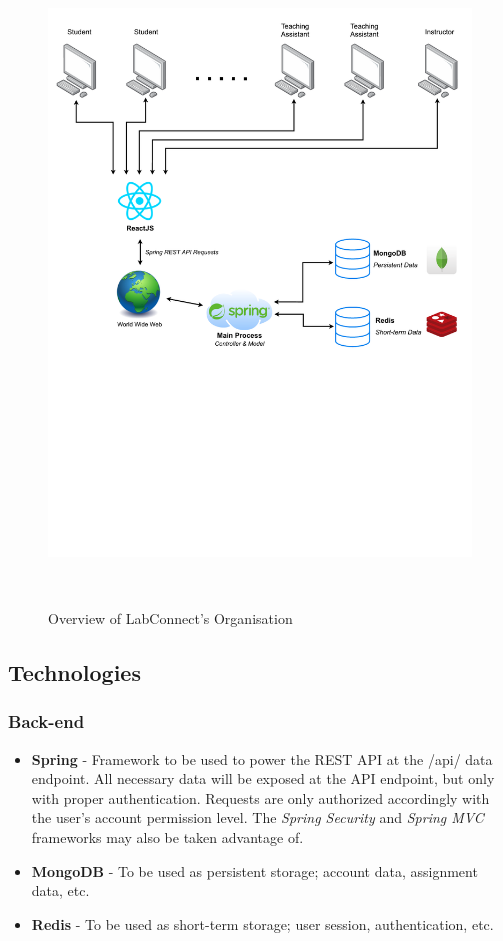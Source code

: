 \documentclass[a4paper, 12pt]{article}
\begin{document}
    \begin{figure}[H]
        \centering
        \includegraphics[width=\textwidth]{organization}
        \caption{Overview of LabConnect's Organisation}~\label{fig:organisation-diagram}
    \end{figure}

    \pagebreak

    \subsection{Technologies}

    \subsubsection{Back-end}

    \begin{itemize}
        \item \textbf{Spring} - Framework to be used to power the REST API at the /api/ data endpoint.
              All necessary data will be exposed at the API endpoint, but only with proper authentication.
              Requests are only authorized accordingly with the user's account permission level.
              The \textit{Spring Security} and \textit{Spring MVC} frameworks may also be taken advantage of.
        \item \textbf{MongoDB} - To be used as persistent storage; account data, assignment data, etc.
        \item \textbf{Redis} - To be used as short-term storage; user session, authentication, etc.
    \end{itemize}
\end{document}
